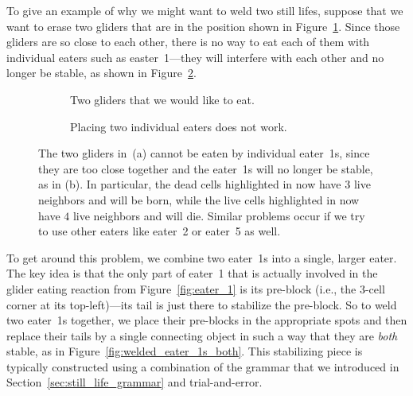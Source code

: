 To give an example of why we might want to weld two still lifes, suppose that we want to erase two gliders that are in the position shown in Figure~\ref{fig:unstable_eater_1s_a}. Since those gliders are so close to each other, there is no way to eat each of them with individual eaters such as easter~1---they will interfere with each other and no longer be stable, as shown in Figure~\ref{fig:unstable_eater_1s_b}.

\begin{figure}[!htb]
	\centering
	\begin{subfigure}{.47\textwidth}
		\centering
		\caption{Two gliders that we would like to eat.}
		\label{fig:unstable_eater_1s_a}
	\end{subfigure} \quad %
	\begin{subfigure}{.47\textwidth}
		\centering
		\caption{Placing two individual eaters does not work.}
		\label{fig:unstable_eater_1s_b}
	\end{subfigure}
	\caption{The two gliders in~(a) cannot be eaten by individual eater~1s, since they are too close together and the eater~1s will no longer be stable, as in (b). In particular, the dead cells highlighted in  now have $3$ live neighbors and will be born, while the live cells highlighted in  now have $4$ live neighbors and will die. Similar problems occur if we try to use other eaters like eater~2 or eater~5 as well.}\label{fig:unstable_eater_1s}
\end{figure}

To get around this problem, we combine two eater~1s into a single, larger eater. The key idea is that the only part of eater~1 that is actually involved in the glider eating reaction from Figure~\ref{fig:eater_1} is its pre-block (i.e., the $3$-cell corner at its top-left)---its tail is just there to stabilize the pre-block. So to weld two eater~1s together, we place their pre-blocks in the appropriate spots and then replace their tails by a single connecting object in such a way that they are \emph{both} stable, as in Figure~\ref{fig:welded_eater_1s_both}. This stabilizing piece is typically constructed using a combination of the grammar that we introduced in Section~\ref{sec:still_life_grammar} and trial-and-error.

